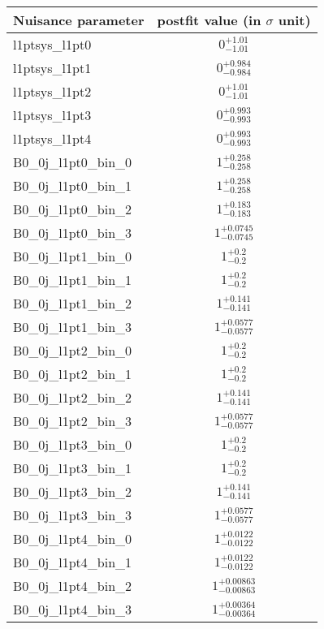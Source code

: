 
\begin{tabular}{|l|c|}
\hline
Nuisance parameter & postfit value (in $\sigma$ unit) \\\hline
l1ptsys\_l1pt0 & $0^{+1.01}_{-1.01}$ \\
l1ptsys\_l1pt1 & $0^{+0.984}_{-0.984}$ \\
l1ptsys\_l1pt2 & $0^{+1.01}_{-1.01}$ \\
l1ptsys\_l1pt3 & $0^{+0.993}_{-0.993}$ \\
l1ptsys\_l1pt4 & $0^{+0.993}_{-0.993}$ \\
B0\_0j\_l1pt0\_bin\_0 & $1^{+0.258}_{-0.258}$ \\
B0\_0j\_l1pt0\_bin\_1 & $1^{+0.258}_{-0.258}$ \\
B0\_0j\_l1pt0\_bin\_2 & $1^{+0.183}_{-0.183}$ \\
B0\_0j\_l1pt0\_bin\_3 & $1^{+0.0745}_{-0.0745}$ \\
B0\_0j\_l1pt1\_bin\_0 & $1^{+0.2}_{-0.2}$ \\
B0\_0j\_l1pt1\_bin\_1 & $1^{+0.2}_{-0.2}$ \\
B0\_0j\_l1pt1\_bin\_2 & $1^{+0.141}_{-0.141}$ \\
B0\_0j\_l1pt1\_bin\_3 & $1^{+0.0577}_{-0.0577}$ \\
B0\_0j\_l1pt2\_bin\_0 & $1^{+0.2}_{-0.2}$ \\
B0\_0j\_l1pt2\_bin\_1 & $1^{+0.2}_{-0.2}$ \\
B0\_0j\_l1pt2\_bin\_2 & $1^{+0.141}_{-0.141}$ \\
B0\_0j\_l1pt2\_bin\_3 & $1^{+0.0577}_{-0.0577}$ \\
B0\_0j\_l1pt3\_bin\_0 & $1^{+0.2}_{-0.2}$ \\
B0\_0j\_l1pt3\_bin\_1 & $1^{+0.2}_{-0.2}$ \\
B0\_0j\_l1pt3\_bin\_2 & $1^{+0.141}_{-0.141}$ \\
B0\_0j\_l1pt3\_bin\_3 & $1^{+0.0577}_{-0.0577}$ \\
B0\_0j\_l1pt4\_bin\_0 & $1^{+0.0122}_{-0.0122}$ \\
B0\_0j\_l1pt4\_bin\_1 & $1^{+0.0122}_{-0.0122}$ \\
B0\_0j\_l1pt4\_bin\_2 & $1^{+0.00863}_{-0.00863}$ \\
B0\_0j\_l1pt4\_bin\_3 & $1^{+0.00364}_{-0.00364}$ \\
\hline
\end{tabular}
